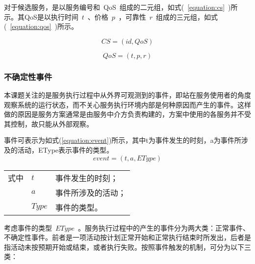 对于候选服务，是以服务编号和~QoS~组成的二元组，如式(~\ref{equation:cs}~)所示。其QoS是以执行时间~$t$~、价格~$p$~，可靠性~$r$~组成的三元组，如式(~\ref{equation:qos}~)所示。

\begin{equation}\label{equation:cs}
CS = (id, QoS)
\end{equation}

\begin{equation}\label{equation:qos}
QoS = (t, p, r)
\end{equation}

\subsubsection{不确定性事件} \label{sec:uc_event}

本课题关注的是服务执行过程中从外界可观测到的事件，即站在服务使用者的角度观察系统的运行状态，而不关心服务执行环境内部是何种原因而产生的事件。这样做的原因是服务方案通常是由服务中介方负责构建的，方案中使用的各服务并不受其控制，故只能从外部观察。

事件可表示为如式(\ref{equation:event})所示，其中t为事件发生的时刻，a为事件所涉及的活动，EType表示事件的类型。
\begin{equation}\label{equation:event}
event = (t, a, EType)
\end{equation}
\begin{tabularx}{\textwidth}{@{}l@{\quad}l@{\pozhehao }X@{}}
    式中
    & $t$ & 事件发生的时刻；\\
    & $a$ & 事件所涉及的活动；\\
    & $Type$ &事件的类型。
\end{tabularx}\vspace{\wordsep}

考虑事件的类型~$EType$~。服务执行过程中的产生的事件分为两大类：正常事件、不确定性事件。前者是一项活动按计划正常开始和正常执行结束时所发出，后者是指活动未按预期开始或结束，或者执行失败。按照事件触发的机制，可分为以下三类：

